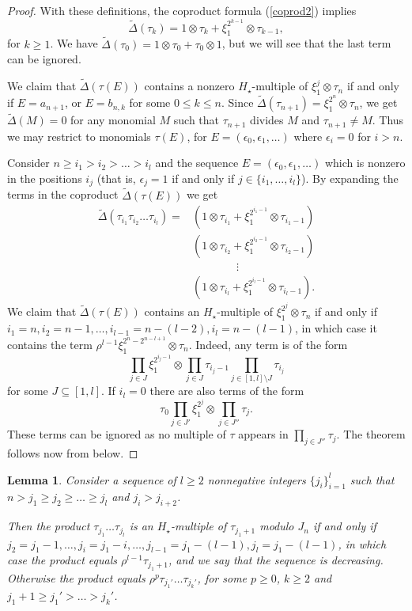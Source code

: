 \documentclass[11pt,hyp]{nyjm}
\newcommand{\tensor}{\otimes}
\newcommand{\DeltaT}{\widetilde{\Delta}}
\theoremstyle{theoremstyle}
\newtheorem{lemma}[theorem]{Lemma}
\theoremstyle{definition}
\theoremstyle{theoremstyle}
\begin{document}
\begin{proof}
  With these definitions, the coproduct formula (\ref{coprod2}) implies
  \[
  \DeltaT (\tau_k) = 1 \tensor \tau_k + \xi_1^{2^{k-1}} \tensor \tau_{k-1},
  \]
  for $k \geq 1$.
  We have $\DeltaT(\tau_0) = 1 \tensor \tau_0 + \tau_0 \tensor 1$, but we will see that the last term can be ignored.

  We claim that $\DeltaT(\tau(E))$ contains a nonzero $H_\star$-multiple of $\xi_1^j \tensor \tau_n$
  if and only if $E = a_{n+1}$, or $E = b_{n,k}$ for some $0 \leq k \leq n$.
  Since $\DeltaT(\tau_{n+1}) = \xi_{1}^{2^{n}}\tensor \tau_n$,
  we get $\DeltaT(M) = 0$ for any monomial $M$ such that $\tau_{n+1}$ divides $M$ and $\tau_{n+1} \neq M$.
  Thus we may restrict to monomials $\tau(E)$, for $E=(\epsilon_0, \epsilon_1, \dots)$ where $\epsilon_i = 0$ for $i > n$.

  Consider $n \geq i_1 > i_2 > \dots > i_l$ and the sequence $E = (\epsilon_0, \epsilon_1, \dots)$ which is nonzero in the positions $i_j$
  (that is, $\epsilon_j = 1$ if and only if $j \in \{i_1, \dots, i_l\}$).
  By expanding the terms in the coproduct $\DeltaT(\tau(E))$ we get
  \begin{align*}
    \DeltaT(\tau_{i_1}\tau_{i_2} \dots \tau_{i_l}) =
    &(1 \tensor \tau_{i_1} + \xi_1^{2^{i_1-1}}\tensor\tau_{i_1-1}) \\
    &(1 \tensor \tau_{i_2} + \xi_1^{2^{i_2-1}}\tensor\tau_{i_2-1}) \\
    &\qquad\qquad\vdots \\
    &(1 \tensor \tau_{i_l} + \xi_1^{2^{i_l-1}}\tensor\tau_{i_l-1}).
  \end{align*}
  We claim that $\DeltaT(\tau(E))$ contains an $H_\star$-multiple of $\xi^{2^{j}}_1 \tensor \tau_{n}$ if and only if $i_1 = n, i_2 = n-1, \dots, i_{l-1} = n-(l-2), i_{l} = n - (l-1)$,
  in which case it contains the term $\rho^{l-1}\xi_1^{2^{n} - 2^{n-l+1}} \tensor \tau_{n}$.
  Indeed, any term is of the form
  \[
  \prod_{j \in J} \xi_{1}^{2^{{i_j}-1}} \tensor \prod_{j \in J} \tau_{i_j - 1} \prod_{j \in [1, l]\setminus J} \tau_{i_j}
  \]
  for some $J \subseteq [1, l]$.
  If $i_l = 0$ there are also terms of the form
  \[\tau_0 \prod_{j \in J'} \xi_1^{2^j} \tensor \prod_{j \in J''} \tau_j.\]
  These terms can be ignored as no multiple of $\tau$ appears in $\prod_{j \in J''} \tau_j$.
  The theorem follows now from  below.
\end{proof}
\begin{lemma}
  \label{induction}
  Consider a sequence of $l \geq 2$ nonnegative integers $\{j_i\}_{i=1}^{l}$ such that $n > j_1 \geq j_2 \geq \dots \geq j_l$ and $j_i > j_{i+2}$.

  Then the product $\tau_{j_1}\dots \tau_{j_l}$ is an $H_\star$-multiple of $\tau_{j_1+1}$ modulo $J_n$ if and only if
  $j_2 = j_1 - 1, \dots, j_{i} = j_1 - i, \dots, j_{l-1} = j_1 - (l-1), j_{l} = j_1-(l-1)$,
  in which case the product equals $\rho^{l-1} \tau_{j_1 + 1}$, and we say that the sequence is decreasing.
  Otherwise the product equals $\rho^p\tau_{j_1'}\dots\tau_{j_k'}$,
  for some $p \geq 0 $, $k \geq 2$ and $j_1 + 1 \geq j_1' > \dots > j_k'$.
\end{lemma}
\end{document}
